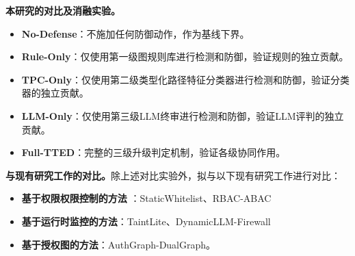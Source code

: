 \textbf{本研究的对比及消融实验。}
\begin{itemize}[leftmargin=2em,itemsep=0pt]
  \item \textbf{No-Defense}：不施加任何防御动作，作为基线下界。
  \item \textbf{Rule-Only}：仅使用第一级图规则库进行检测和防御，验证规则的独立贡献。
  \item \textbf{TPC-Only}：仅使用第二级类型化路径特征分类器进行检测和防御，验证分类器的独立贡献。
  \item \textbf{LLM-Only}：仅使用第三级LLM终审进行检测和防御，验证LLM评判的独立贡献。
  \item \textbf{Full-TTED}：完整的三级升级判定机制，验证各级协同作用。
\end{itemize}

\textbf{与现有研究工作的对比。}除上述对比实验外，拟与以下现有研究工作进行对比：
\begin{itemize}[leftmargin=2em,itemsep=0pt]
  \item \textbf{基于权限权限控制的方法}
：StaticWhitelist\cite{yao2023react,schick2023toolformer}、RBAC-ABAC\cite{shi2025progent}
  \item \textbf{基于运行时监控的方法}：TaintLite\cite{costa2025fides}、DynamicLLM-Firewall\cite{abdelnabi2025firewalls}
  \item \textbf{基于授权图的方法}：AuthGraph-DualGraph\cite{wang2026authgraph}。
\end{itemize}

